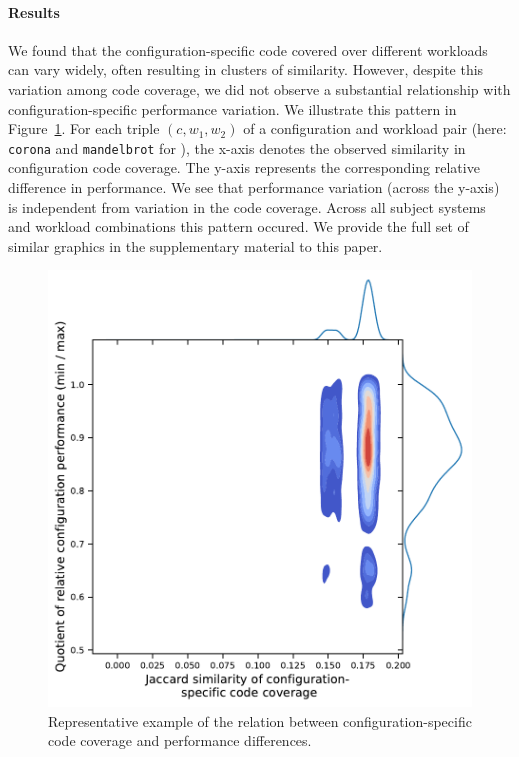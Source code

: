\paragraph*{Results} {\color{blue} 
We found that the configuration-specific code covered over different workloads can vary widely, often resulting in clusters of similarity. However, despite this variation among code coverage, 
we did not observe a substantial relationship with configuration-specific performance variation. We illustrate this pattern in Figure~\ref{fig:example_coverage_performance}. For each triple $(c, w_1, w_2)$ of a configuration and workload pair (here: \texttt{corona} and \texttt{mandelbrot} for \batik), the x-axis denotes the observed similarity in configuration code coverage. The y-axis represents the corresponding relative difference in performance. We see that performance variation (across the y-axis) is independent from variation in the code coverage. Across all subject systems and workload combinations this pattern occured. We provide the full set of similar graphics in the supplementary material to this paper.\
\vspace{1em}	
}

\begin{figure}
	\centering
	\includegraphics[width=0.98\linewidth]{images/configuration_coverage_corona_mandelbrot.pdf}
	\caption{Representative example of the relation between configuration-specific code coverage and performance differences.}
	\label{fig:example_coverage_performance}
\end{figure}



